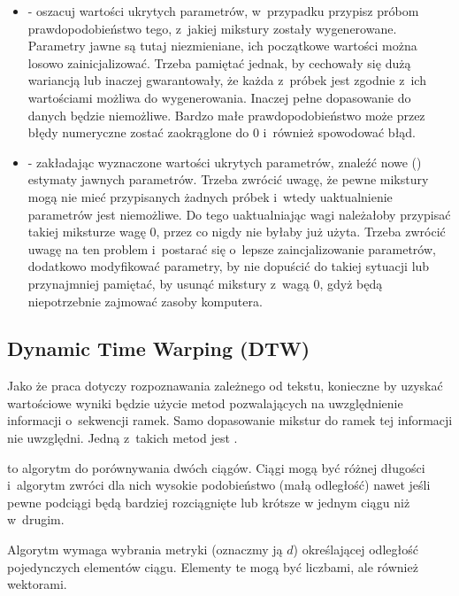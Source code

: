 \begin{itemize}
    \item {} - oszacuj wartości ukrytych parametrów, w~przypadku  przypisz próbom
        prawdopodobieństwo tego, z~jakiej mikstury zostały wygenerowane. Parametry jawne są tutaj niezmieniane,
        ich początkowe wartości można losowo zainicjalizować. Trzeba pamiętać jednak, by cechowały się dużą wariancją
        lub inaczej gwarantowały, że każda z~próbek jest zgodnie z~ich wartościami możliwa do wygenerowania. Inaczej
        pełne dopasowanie do danych będzie niemożliwe. Bardzo małe prawdopodobieństwo może przez błędy numeryczne
        zostać zaokrąglone do $0$ i~również spowodować błąd.
    \item {} - zakładając wyznaczone wartości ukrytych parametrów, znaleźć nowe 
        () estymaty
        jawnych parametrów. Trzeba zwrócić uwagę, że pewne mikstury mogą nie mieć przypisanych żadnych próbek
        i~wtedy uaktualnienie parametrów jest niemożliwe. Do tego uaktualniając wagi  należałoby
        przypisać takiej miksturze wagę $0$, przez co nigdy nie byłaby już użyta. Trzeba zwrócić uwagę na ten problem
        i~postarać się o~lepsze zaincjalizowanie parametrów, dodatkowo modyfikować parametry, by nie dopuścić
        do takiej sytuacji lub przynajmniej pamiętać, by usunąć mikstury z~wagą $0$, gdyż będą niepotrzebnie zajmować
        zasoby komputera.
\end{itemize}

\subsection{Dynamic Time Warping (DTW)\cite{ADynamicProgrammingApproach}}\label{sec:dtw}

Jako że praca dotyczy rozpoznawania zależnego od tekstu, konieczne by uzyskać wartościowe wyniki będzie
użycie metod pozwalających na uwzględnienie informacji o~sekwencji ramek. Samo dopasowanie mikstur do ramek
tej informacji nie uwzględni. Jedną z~takich metod jest .

 to algorytm do porównywania dwóch ciągów. Ciągi mogą być różnej długości i~algorytm zwróci
dla nich wysokie podobieństwo (małą odległość) nawet jeśli pewne podciągi będą bardziej rozciągnięte lub krótsze
w jednym ciągu niż w~drugim.

Algorytm wymaga wybrania metryki (oznaczmy ją $d$) określającej odległość pojedynczych elementów ciągu.
Elementy te mogą być liczbami, ale również wektorami.

